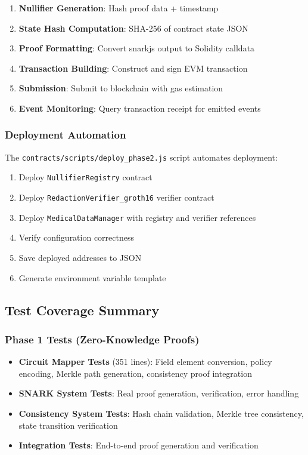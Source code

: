 \begin{enumerate}
    \item \textbf{Nullifier Generation}: Hash proof data + timestamp
    \item \textbf{State Hash Computation}: SHA-256 of contract state JSON
    \item \textbf{Proof Formatting}: Convert snarkjs output to Solidity calldata
    \item \textbf{Transaction Building}: Construct and sign EVM transaction
    \item \textbf{Submission}: Submit to blockchain with gas estimation
    \item \textbf{Event Monitoring}: Query transaction receipt for emitted events
\end{enumerate}

\subsubsection{Deployment Automation}

The \texttt{contracts/scripts/deploy\_phase2.js} script automates deployment:

\begin{enumerate}
    \item Deploy \texttt{NullifierRegistry} contract
    \item Deploy \texttt{RedactionVerifier\_groth16} verifier contract
    \item Deploy \texttt{MedicalDataManager} with registry and verifier references
    \item Verify configuration correctness
    \item Save deployed addresses to JSON
    \item Generate environment variable template
\end{enumerate}

\subsection{Test Coverage Summary}

\subsubsection{Phase 1 Tests (Zero-Knowledge Proofs)}

\begin{itemize}
    \item \textbf{Circuit Mapper Tests} (351 lines): Field element conversion, policy encoding, Merkle path generation, consistency proof integration
    \item \textbf{SNARK System Tests}: Real proof generation, verification, error handling
    \item \textbf{Consistency System Tests}: Hash chain validation, Merkle tree consistency, state transition verification
    \item \textbf{Integration Tests}: End-to-end proof generation and verification
\end{itemize}

